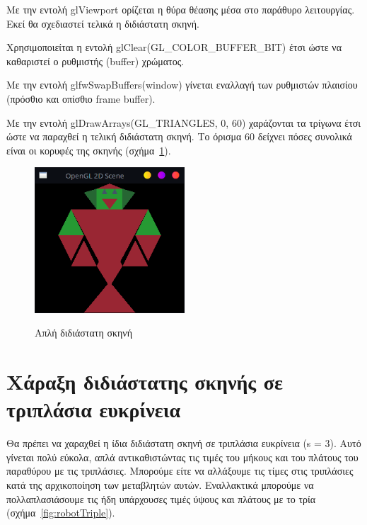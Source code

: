 \documentclass[12pt]{article}
\begin{document}
 Με την εντολή glViewport ορίζεται η θύρα θέασης μέσα στο παράθυρο λειτουργίας. Εκεί θα σχεδιαστεί τελικά η διδιάστατη σκηνή. 

Χρησιμοποιείται η εντολή glClear(GL\_COLOR\_BUFFER\_BIT) έτσι ώστε να καθαριστεί ο ρυθμιστής (buffer) χρώματος. 

Με την εντολή glfwSwapBuffers(window) γίνεται εναλλαγή των ρυθμιστών πλαισίου (πρόσθιο και οπίσθιο frame buffer). 

Με την εντολή glDrawArrays(GL\_TRIANGLES, 0, 60) χαράζονται τα τρίγωνα έτσι ώστε να παραχθεί η τελική διδιάστατη σκηνή. Το όρισμα 60 δείχνει πόσες συνολικά είναι οι κορυφές της σκηνής (σχήμα~\ref{fig:robotOriginal}).

\begin{figure}[!h]
\centering
    {\includegraphics[width=0.5\textwidth]
    {robot_original.png}}
    \caption{\label{fig:robotOriginal} Απλή διδιάστατη σκηνή}
\end{figure}

\section{Χάραξη διδιάστατης σκηνής σε τριπλάσια ευκρίνεια}
Θα πρέπει να χαραχθεί η ίδια διδιάστατη σκηνή σε τριπλάσια ευκρίνεια (s = 3). Αυτό γίνεται πολύ εύκολα, απλά αντικαθιστώντας τις τιμές του μήκους και του πλάτους του παραθύρου με τις τριπλάσιες. Μπορούμε είτε να αλλάξουμε τις τίμες στις τριπλάσιες κατά της αρχικοποίηση των μεταβλητών αυτών. Εναλλακτικά μπορούμε να πολλαπλασιάσουμε τις ήδη υπάρχουσες τιμές ύψους και πλάτους με το τρία (σχήμα~\ref{fig:robotTriple}).
\end{document}
